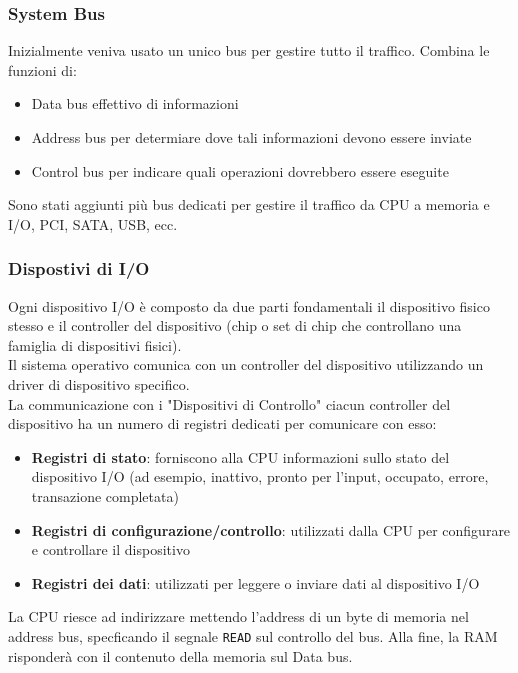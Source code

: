 \documentclass{article}
\begin{document}
    \subsubsection{System Bus}
    Inizialmente veniva usato un unico bus per gestire tutto il traffico. Combina le funzioni di: 
    \begin{itemize}
        \item Data bus effettivo di informazioni
        \item Address bus per determiare dove tali informazioni devono essere inviate
        \item Control bus per indicare quali operazioni dovrebbero essere eseguite
    \end{itemize}
    Sono stati aggiunti più bus dedicati per gestire il traffico da CPU a memoria e I/O, PCI, SATA, USB, ecc.
    
    \subsubsection{Dispostivi di I/O}
    Ogni dispositivo I/O è composto da due parti fondamentali il dispositivo fisico stesso e il controller del dispositivo (chip o set di chip che controllano una famiglia di dispositivi fisici).\\
    Il sistema operativo comunica con un controller del dispositivo utilizzando un driver di dispositivo specifico.\\
    La communicazione con i "Dispositivi di Controllo" ciacun controller del dispositivo ha un numero di registri dedicati per comunicare con esso:
    \begin{itemize}
        \item \textbf{Registri di stato}: forniscono alla CPU informazioni sullo stato del dispositivo I/O (ad esempio, inattivo, pronto per l'input, occupato, errore, transazione completata)
        \item \textbf{ Registri di configurazione/controllo}: utilizzati dalla CPU per configurare e controllare il dispositivo
        \item \textbf{Registri dei dati}: utilizzati per leggere o inviare dati al dispositivo I/O
    \end{itemize}
    La CPU riesce ad indirizzare mettendo l'address di un byte di memoria nel address bus, specficando il segnale \texttt{READ} sul controllo del bus. Alla fine, la RAM risponderà con il contenuto della memoria sul Data bus.
    
\end{document}
